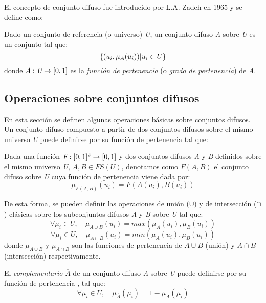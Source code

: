El concepto de conjunto difuso fue introducido por L.A. Zadeh en 1965 \cite{Zadeh65} y se define como:
\begin{definition}
Dado un conjunto de referencia (o universo) \emph{U}, un conjunto difuso \emph{A} sobre \emph{U} es un conjunto tal que:\\
\begin{equation}
\{(u_{i},\mu_{A}(u_{i}))\arrowvert u_{i} \in U\}
\end{equation}
donde \begin{math}\emph{A}:\emph{U}\rightarrow[0,1]\end{math} es la \emph{función de pertenencia} (o \emph{grado de pertenencia}) de \emph{A}.
\end{definition}
\subsection{Operaciones sobre conjuntos difusos}
En esta sección se definen algunas operaciones básicas sobre conjuntos difusos. Un conjunto difuso compuesto a partir de dos conjuntos difusos sobre el mismo universo \emph{U} puede definirse por su función de pertenencia tal que:
\begin{definition}
Dada una función \begin{math}\emph{F}:[0,1]^2\rightarrow[0,1]\end{math} y dos conjuntos difusos \emph{A} y \emph{B} definidos sobre el mismo universo \emph{U}, \begin{math}A,B\in FS(U)\end{math}, denotamos como \begin{math}F(A,B)\end{math} el conjunto difuso sobre \emph{U} cuya función de pertenencia viene dada por:
\begin{equation}
\mu_{F(A,B)}(u_{i}) = F(A(u_{i}),B(u_{i}))
\end{equation}
\end{definition}
De esta forma, se pueden definir las operaciones de unión ($\cup$) y de intersección ($\cap$) clásicas sobre los subconjuntos difusos \emph{A} y \emph{B} sobre \emph{U} \cite{dubois1980} tal que:
\begin{equation}
\forall\mu_{i}\in U,\quad\mu_{A\cup B}(u_{i}) = max(\mu_{A}(u_{i}),\mu_{B}(u_{i}))
\end{equation}
\begin{equation}
\forall\mu_{i}\in U,\quad\mu_{A\cap B}(u_{i}) = min(\mu_{A}(u_{i}),\mu_{B}(u_{i}))
\end{equation}
donde $\mu_{A\cup B}$ y $\mu_{A\cap B}$ son las funciones de pertenencia de $A\cup B$ (unión) y $A\cap B$ (intersección) respectivamente.
\begin{definition}
El \emph{complementario} \emph{$\overline{A}$} de un conjunto difuso \emph{A} sobre \emph{U} puede definirse por su función de pertenencia \cite{Zadeh65}, tal que:
\begin{equation}
\forall \mu_{i} \in U, \quad \mu_{\overline{A}}(\mu_{i}) = 1 - \mu_{A}(\mu_{i})
\end{equation}
\end{definition}


